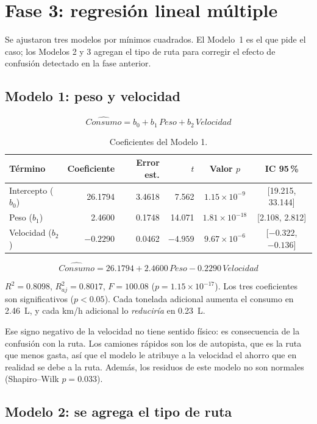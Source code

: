 \documentclass[12pt,letterpaper]{article}
\begin{document}
\section{Fase 3: regresión lineal múltiple}

Se ajustaron tres modelos por mínimos cuadrados. El Modelo~1 es el que pide el caso; los Modelos 2 y 3 agregan el tipo de ruta para corregir el efecto de confusión detectado en la fase anterior.

\subsection{Modelo 1: peso y velocidad}\label{sec:m1}

$$ \widehat{Consumo} = b_0 + b_1\,Peso + b_2\,Velocidad $$

\begin{table}[H]
\centering
\caption{Coeficientes del Modelo 1.}
\label{tab:m1}
\begin{tabular}{lrrrcc}
\toprule
Término & Coeficiente & Error est. & $t$ & Valor $p$ & IC 95\,\% \\
\midrule
Intercepto ($b_0$) & 26.1794 & 3.4618 & 7.562  & $1.15 \times 10^{-9}$  & [19.215, 33.144] \\
Peso ($b_1$)       &  2.4600 & 0.1748 & 14.071 & $1.81 \times 10^{-18}$ & [2.108, 2.812] \\
Velocidad ($b_2$)  & $-0.2290$ & 0.0462 & $-4.959$ & $9.67 \times 10^{-6}$ & [$-0.322$, $-0.136$] \\
\bottomrule
\end{tabular}
\end{table}

$$ \boxed{\widehat{Consumo} = 26.1794 + 2.4600\,Peso - 0.2290\,Velocidad} $$

$R^2 = 0.8098$, $R^2_{aj} = 0.8017$, $F = 100.08$ ($p = 1.15 \times 10^{-17}$). Los tres coeficientes son significativos ($p < 0.05$). Cada tonelada adicional aumenta el consumo en 2.46~L, y cada km/h adicional lo \emph{reduciría} en 0.23~L.

Ese signo negativo de la velocidad no tiene sentido físico: es consecuencia de la confusión con la ruta. Los camiones rápidos son los de autopista, que es la ruta que menos gasta, así que el modelo le atribuye a la velocidad el ahorro que en realidad se debe a la ruta. Además, los residuos de este modelo no son normales (Shapiro--Wilk $p = 0.033$).

\subsection{Modelo 2: se agrega el tipo de ruta}
\end{document}
